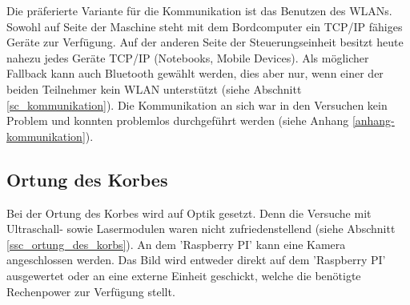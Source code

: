 Die präferierte Variante für die Kommunikation ist das Benutzen des WLANs. Sowohl auf Seite der Maschine steht mit dem Bordcomputer ein TCP/IP fähiges Geräte zur Verfügung. Auf der anderen Seite der Steuerungseinheit besitzt heute nahezu jedes Geräte TCP/IP (Notebooks, Mobile Devices). Als möglicher Fallback kann auch Bluetooth gewählt werden, dies aber nur, wenn einer der beiden Teilnehmer kein WLAN unterstützt (siehe Abschnitt \ref{sc_kommunikation}).
Die Kommunikation an sich war in den Versuchen kein Problem und konnten problemlos durchgeführt werden (siehe Anhang \ref{anhang-kommunikation}).

\subsection{Ortung des Korbes}
Bei der Ortung des Korbes wird auf Optik gesetzt. Denn die Versuche mit Ultraschall- sowie Lasermodulen waren nicht zufriedenstellend (siehe Abschnitt \ref{ssc_ortung_des_korbs}).
An dem 'Raspberry PI' kann eine Kamera angeschlossen werden. Das Bild wird entweder direkt auf dem 'Raspberry PI' ausgewertet oder an eine externe Einheit geschickt, welche die benötigte Rechenpower zur Verfügung stellt.
